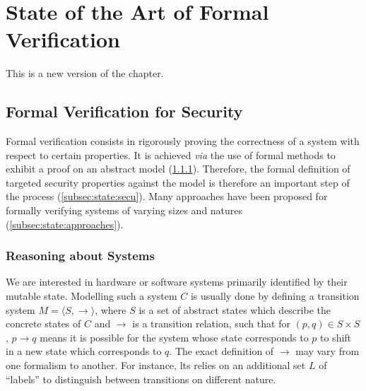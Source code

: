\chapter{State of the Art of Formal Verification}
\label{chapter:relatedwork}


\vspace{1cm}\noindent
%
This is a new version of the chapter.

\section{Formal Verification for Security}

Formal verification consists in rigorously proving the correctness of a system
with respect to certain properties.
%
It is achieved \emph{via} the use of formal methods to exhibit a proof on an
abstract model (\ref{subsec:state:reason}).
%
Therefore, the formal definition of targeted security properties against the
model is therefore an important step of the process (\ref{subsec:state:secu}).
%
Many approaches have been proposed for formally verifying systems of varying
sizes and natures (\ref{subsec:state:approaches}).

\subsection{Reasoning about Systems}
\label{subsec:state:reason}

We are interested in hardware or software systems primarily identified by their
mutable state.
%
Modelling such a system $C$ is usually done by defining a transition system
$M = \langle S, \rightarrow \rangle$, where $S$ is a set of abstract states
which describe the concrete states of $C$ and $\rightarrow$ is a transition
relation, such that for $(p, q) \in S \times S$, $p \rightarrow q$ means it is
possible for the system whose state corresponds to $p$ to shift in a new state
which corresponds to $q$.
%
The exact definition of $\rightarrow$ may vary from one formalism to
another. For instance, \ac{lts} relies on an additional set $L$ of ``labels'' to
distinguish between transitions on different nature.

